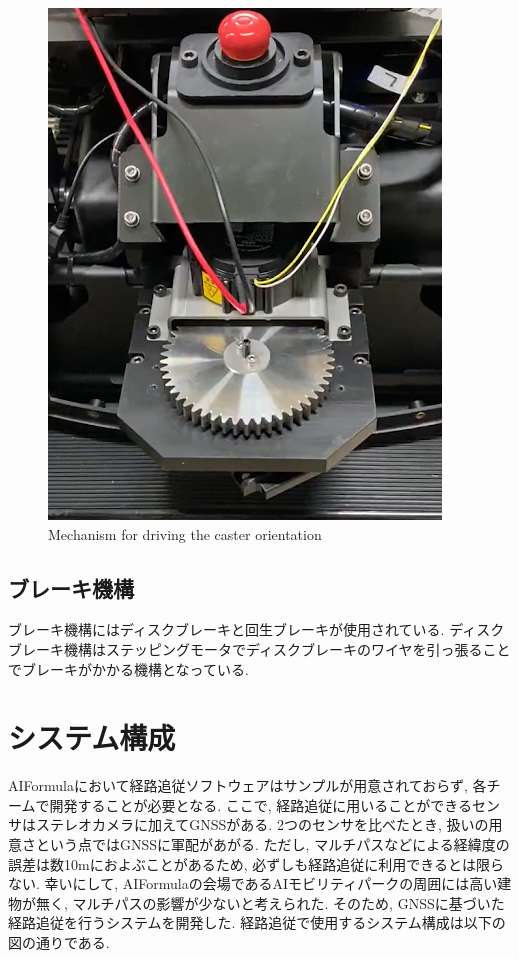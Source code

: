 
\begin{figure}[H]
  \centering
 \includegraphics[keepaspectratio, scale=0.5]
      {images/caster.png}
 \caption{Mechanism for driving the caster orientation}
 \label{fig:Mechanism for driving the caster orientation}
\end{figure}

\subsection{ブレーキ機構}
ブレーキ機構にはディスクブレーキと回生ブレーキが使用されている.
ディスクブレーキ機構はステッピングモータでディスクブレーキのワイヤを引っ張ることでブレーキがかかる機構となっている.

\section{システム構成}
AIFormulaにおいて経路追従ソフトウェアはサンプルが用意されておらず, 各チームで開発することが必要となる.
ここで, 経路追従に用いることができるセンサはステレオカメラに加えてGNSSがある.
2つのセンサを比べたとき, 扱いの用意さという点ではGNSSに軍配があがる.
ただし, マルチパスなどによる経緯度の誤差は数10mにおよぶことがあるため, 必ずしも経路追従に利用できるとは限らない.
幸いにして, AIFormulaの会場であるAIモビリティパークの周囲には高い建物が無く, マルチパスの影響が少ないと考えられた.
そのため, GNSSに基づいた経路追従を行うシステムを開発した.
経路追従で使用するシステム構成は以下の図の通りである.

